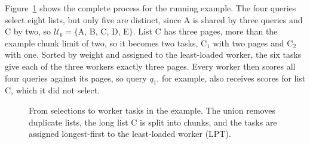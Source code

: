 Figure~\ref{fig:example-schedule} shows the complete process for the running example. The four queries select eight lists, but only five are distinct, since A is shared by three queries and C by two, so \(\mathcal U_b=\{\)A, B, C, D, E\(\}\). List C has three pages, more than the example chunk limit of two, so it becomes two tasks, C\(_1\) with two pages and C\(_2\) with one. Sorted by weight and assigned to the least-loaded worker, the six tasks give each of the three workers exactly three pages. Every worker then scores all four queries against its pages, so query \(q_1\), for example, also receives scores for list C, which it did not select.

\begin{figure}[htbp]
\centering
{}
\caption{From selections to worker tasks in the example. The union removes
duplicate lists, the long list C is split into chunks, and the tasks are
assigned longest-first to the least-loaded worker (LPT).}
\label{fig:example-schedule}
\end{figure}

